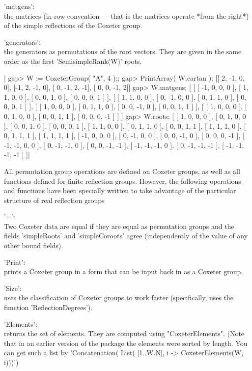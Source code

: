 'matgens':\\  the  matrices  (in  row  convention  ---  that is the matrices
       operate  *from the right*) of the  simple reflections of the Coxeter
       group.

'generators':\\ the generators as permutations of the root vectors.  They
       are given in the same order as the first 'SemisimpleRank(W)' roots.

|    gap> W := CoxeterGroup( "A", 4 );;
    gap> PrintArray( W.cartan );
    [[ 2, -1,  0,  0],
     [-1,  2, -1,  0],
     [ 0, -1,  2, -1],
     [ 0,  0, -1,  2]]
    gap> W.matgens;
    [ [ [ -1, 0, 0, 0 ], [ 1, 1, 0, 0 ], [ 0, 0, 1, 0 ], [ 0, 0, 0, 1 ] ],
      [ [ 1, 1, 0, 0 ], [ 0, -1, 0, 0 ], [ 0, 1, 1, 0 ], [ 0, 0, 0, 1 ] ],
      [ [ 1, 0, 0, 0 ], [ 0, 1, 1, 0 ], [ 0, 0, -1, 0 ], [ 0, 0, 1, 1 ] ],
      [ [ 1, 0, 0, 0 ], [ 0, 1, 0, 0 ], [ 0, 0, 1, 1 ], [ 0, 0, 0, -1 ] ]
     ]
    gap> W.roots;
    [ [ 1, 0, 0, 0 ], [ 0, 1, 0, 0 ], [ 0, 0, 1, 0 ], [ 0, 0, 0, 1 ],
      [ 1, 1, 0, 0 ], [ 0, 1, 1, 0 ], [ 0, 0, 1, 1 ], [ 1, 1, 1, 0 ],
      [ 0, 1, 1, 1 ], [ 1, 1, 1, 1 ], [ -1, 0, 0, 0 ], [ 0, -1, 0, 0 ],
      [ 0, 0, -1, 0 ], [ 0, 0, 0, -1 ], [ -1, -1, 0, 0 ],
      [ 0, -1, -1, 0 ], [ 0, 0, -1, -1 ], [ -1, -1, -1, 0 ],
      [ 0, -1, -1, -1 ], [ -1, -1, -1, -1 ] ]|


All  permutation group operations are defined on Coxeter groups, as well as
all  functions defined for finite reflection groups. However, the following
operations  and functions have been specially  written to take advantage of
the particular structure of real reflection groups\:

'=':\\ Two Coxeter data are equal if they are equal as permutation groups
     and   the    fields   'simpleRoots'  and    'simpleCoroots'    agree
     (independently of the value of   any other bound fields).

'Print':\\  prints a Coxeter group in  a form that  can  be input back in
     {\GAP} as a Coxeter group.

'Size':\\  uses  the classification  of  Coxeter   groups to work  faster
     (specifically, uses the function 'ReflectionDegrees').

'Elements':\\ returns the  set    of elements. They are    computed using
     "CoxeterElements". (Note that in an  earlier version of the package
     the elements  were sorted  by length.  You can get  such a  list by
     'Concatenation( List( [1..W.N], i -> CoxeterElements(W, i)))')

